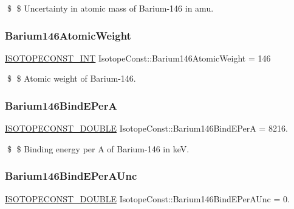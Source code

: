 \$ \$ Uncertainty in atomic mass of Barium-\/146 in amu. \mbox{\label{group___isotope_const-_barium-_ba146_ga852d6c86757ba74d1d89746f4d1bf87e}} 
\subsubsection{\texorpdfstring{Barium146\+Atomic\+Weight}{Barium146AtomicWeight}}
{\footnotesize\ttfamily \mbox{\hyperlink{group___isotope_const-_macros_ga5f18360b3e99483a35c32d789e62621c}{I\+S\+O\+T\+O\+P\+E\+C\+O\+N\+S\+T\+\_\+\+I\+NT}} Isotope\+Const\+::\+Barium146\+Atomic\+Weight = 146}

\$ \$ Atomic weight of Barium-\/146. \mbox{\label{group___isotope_const-_barium-_ba146_gaca1dc8ac718615b9bf9dd39c70a54f55}} 
\subsubsection{\texorpdfstring{Barium146\+Bind\+E\+PerA}{Barium146BindEPerA}}
{\footnotesize\ttfamily \mbox{\hyperlink{group___isotope_const-_macros_ga8f45a7272ce02c0b4c65c44636ed719a}{I\+S\+O\+T\+O\+P\+E\+C\+O\+N\+S\+T\+\_\+\+D\+O\+U\+B\+LE}} Isotope\+Const\+::\+Barium146\+Bind\+E\+PerA = 8216.}

\$ \$ Binding energy per A of Barium-\/146 in keV. \mbox{\label{group___isotope_const-_barium-_ba146_gaf1c232882a5ecf8cf32a65ebe368f46f}} 
\subsubsection{\texorpdfstring{Barium146\+Bind\+E\+Per\+A\+Unc}{Barium146BindEPerAUnc}}
{\footnotesize\ttfamily \mbox{\hyperlink{group___isotope_const-_macros_ga8f45a7272ce02c0b4c65c44636ed719a}{I\+S\+O\+T\+O\+P\+E\+C\+O\+N\+S\+T\+\_\+\+D\+O\+U\+B\+LE}} Isotope\+Const\+::\+Barium146\+Bind\+E\+Per\+A\+Unc = 0.}


